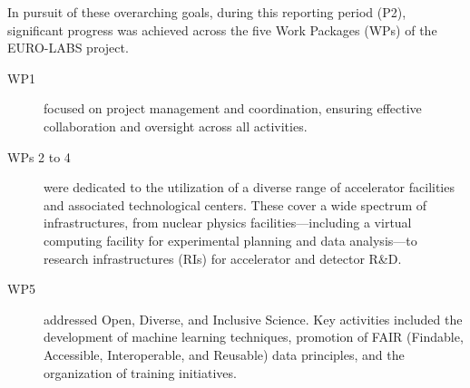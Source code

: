 In pursuit of these overarching goals,
during this reporting period (P2), significant progress was achieved across the five Work Packages (WPs) of the EURO-LABS project.

\begin{description}
    \item[WP1] focused on project management and coordination, ensuring effective collaboration and oversight across all activities.
    
    \item[WPs 2 to 4] were dedicated to the utilization of a diverse range of accelerator facilities and associated technological centers. These cover a wide spectrum of infrastructures, from nuclear physics facilities---including a virtual computing facility for experimental planning and data analysis---to research infrastructures (RIs) for accelerator and detector R\&D.
    
    \item[WP5] addressed Open, Diverse, and Inclusive Science. Key activities included the development of machine learning techniques, promotion of FAIR (Findable, Accessible, Interoperable, and Reusable) data principles, and the organization of training initiatives.
\end{description}

